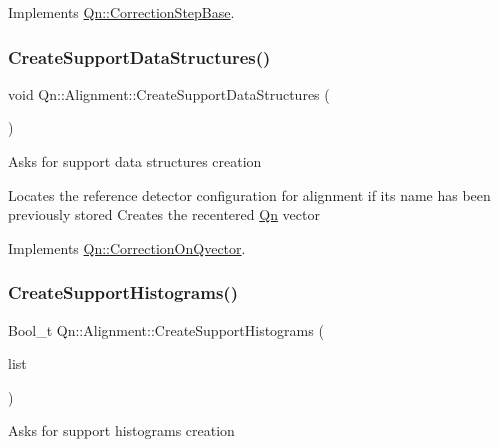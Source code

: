 Implements \mbox{\hyperlink{classQn_1_1CorrectionStepBase_a21f58f5d91209c1c74d0928cf0b3e26d}{Qn\+::\+Correction\+Step\+Base}}.

\mbox{\label{classQn_1_1Alignment_afb0137bb2443eb44448bf15734096765}} 
\subsubsection{\texorpdfstring{Create\+Support\+Data\+Structures()}{CreateSupportDataStructures()}}
{\footnotesize\ttfamily void Qn\+::\+Alignment\+::\+Create\+Support\+Data\+Structures (\begin{DoxyParamCaption}{ }\end{DoxyParamCaption})\hspace{0.3cm}{\ttfamily [virtual]}}

Asks for support data structures creation

Locates the reference detector configuration for alignment if its name has been previously stored Creates the recentered \mbox{\hyperlink{namespaceQn}{Qn}} vector 

Implements \mbox{\hyperlink{classQn_1_1CorrectionOnQvector_ac7c019bc36ac90618ed6e5fc768ca593}{Qn\+::\+Correction\+On\+Qvector}}.

\mbox{\label{classQn_1_1Alignment_ada53d00555fc8a59644b3db5a8584de3}} 
\subsubsection{\texorpdfstring{Create\+Support\+Histograms()}{CreateSupportHistograms()}}
{\footnotesize\ttfamily Bool\+\_\+t Qn\+::\+Alignment\+::\+Create\+Support\+Histograms (\begin{DoxyParamCaption}\item[{T\+List $\ast$}]{list }\end{DoxyParamCaption})\hspace{0.3cm}{\ttfamily [virtual]}}

Asks for support histograms creation

